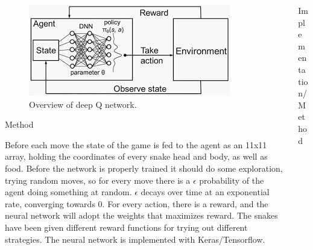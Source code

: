 \documentclass[final]{beamer}
\newlength{\onecolwid}
\newlength{\twocolwid}
\begin{document}
\begin{frame}[t]
\begin{columns}[t]
\begin{column}{\twocolwid}
\begin{columns}[t,totalwidth=\twocolwid]
\begin{column}{\onecolwid}
\begin{figure}
\includegraphics[width=1\linewidth]{deepq.jpeg}
\caption{Overview of deep Q network.}
\end{figure}

\begin{block}{Method}

Before each move the state of the game is fed to the agent as an 11x11 array, holding the coordinates of every snake head and body, as well as food. 
Before the network is properly trained it should do some exploration, trying random moves, so for every move there is a $\epsilon$ probability of the agent doing something at random. $\epsilon$ decays over time at an exponential rate, converging towards 0. 
For every action, there is a reward, and the neural network will adopt the weights that maximizes reward. The snakes have been given different reward functions for trying out different strategies. 
The neural network is implemented with Keras/Tensorflow. 
\end{block}


\end{column} %

\begin{column}{\onecolwid}\vspace{-.6in} %


\begin{block}{Implementation/Method}
			

\end{block}
\end{column}
\end{columns}
\end{column}
\end{columns}
\end{frame}
\end{document}
